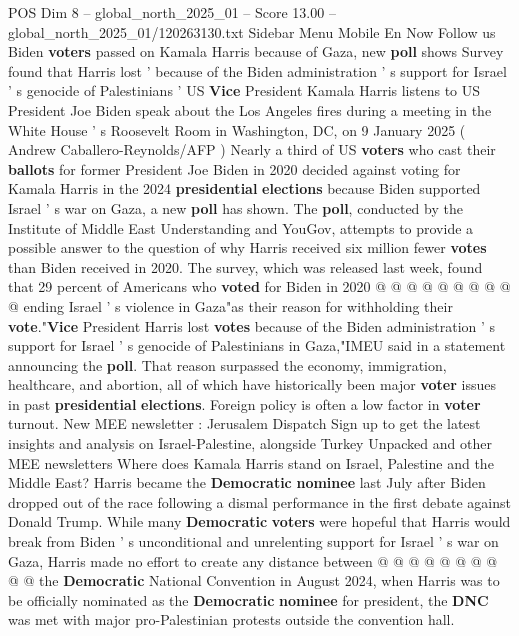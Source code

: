 \begin{textsample}{POS Dim 8 – global\_north\_2025\_01 – Score 13.00 – global\_north\_2025\_01/120263130.txt}  \label{ex:f8_pos_289}
Sidebar Menu Mobile En Now Follow us Biden \textbf{voters} passed on Kamala Harris because of Gaza, new \textbf{poll} shows Survey found that Harris lost ' because of the Biden administration ' s support for Israel ' s genocide of Palestinians ' US \textbf{Vice} President Kamala Harris listens to US President Joe Biden speak about the Los Angeles fires during a meeting in the White House ' s Roosevelt Room in Washington, DC, on 9 January 2025 ( Andrew Caballero-Reynolds/AFP ) Nearly a third of US \textbf{voters} who cast their \textbf{ballots} for former President Joe Biden in 2020 decided against voting for Kamala Harris in the 2024 \textbf{presidential} \textbf{elections} because Biden supported Israel ' s war on Gaza, a new \textbf{poll} has shown.
The \textbf{poll}, conducted by the Institute of Middle East Understanding and YouGov, attempts to provide a possible answer to the question of why Harris received six million fewer \textbf{votes} than Biden received in 2020.
The survey, which was released last week, found that 29 percent of Americans who \textbf{voted} for Biden in 2020 @ @ @ @ @ @ @ @ @ @ ending Israel ' s violence in Gaza"as their reason for withholding their \textbf{vote}."\textbf{Vice} President Harris lost \textbf{votes} because of the Biden administration ' s support for Israel ' s genocide of Palestinians in Gaza,"IMEU said in a statement announcing the \textbf{poll}.
That reason surpassed the economy, immigration, healthcare, and abortion, all of which have historically been major \textbf{voter} issues in past \textbf{presidential} \textbf{elections}.
Foreign policy is often a low factor in \textbf{voter} turnout.
New MEE newsletter : Jerusalem Dispatch Sign up to get the latest insights and analysis on Israel-Palestine, alongside Turkey Unpacked and other MEE newsletters Where does Kamala Harris stand on Israel, Palestine and the Middle East?
Harris became the \textbf{Democratic} \textbf{nominee} last July after Biden dropped out of the race following a dismal performance in the first debate against Donald Trump.
While many \textbf{Democratic} \textbf{voters} were hopeful that Harris would break from Biden ' s unconditional and unrelenting support for Israel ' s war on Gaza, Harris made no effort to create any distance between @ @ @ @ @ @ @ @ @ @ the \textbf{Democratic} National Convention in August 2024, when Harris was to be officially nominated as the \textbf{Democratic} \textbf{nominee} for president, the \textbf{DNC} was met with major pro-Palestinian protests outside the convention hall.

\end{textsample}
